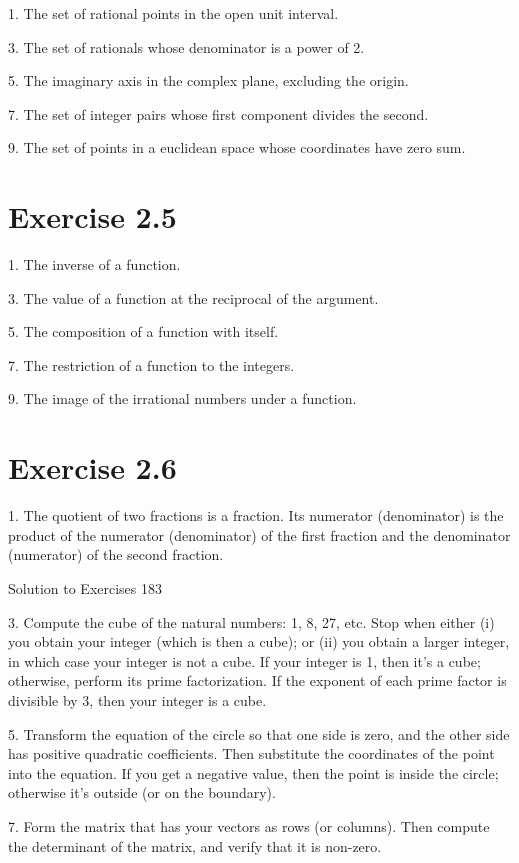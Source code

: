 \documentclass[11pt]{article}
\theoremstyle{plain}
\theoremstyle{definition}
\begin{document}
1. The set of rational points in the open unit interval.

3. The set of rationals whose denominator is a power of 2.

5. The imaginary axis in the complex plane, excluding the origin.

7. The set of integer pairs whose first component divides the second.

9. The set of points in a euclidean space whose coordinates have zero sum.

\section{Exercise 2.5}

1. The inverse of a function.

3. The value of a function at the reciprocal of the argument.

5. The composition of a function with itself.

7. The restriction of a function to the integers.

9. The image of the irrational numbers under a function.

\section{Exercise 2.6}

1. The quotient of two fractions is a fraction. Its numerator (denominator) is the product of the numerator (denominator) of the first fraction and the denominator (numerator) of the second fraction.

Solution to Exercises 183

3. Compute the cube of the natural numbers: 1, 8, 27, etc. Stop when either (i) you obtain your integer (which is then a cube); or (ii) you obtain a larger integer, in which case your integer is not a cube. If your integer is 1, then it's a cube; otherwise, perform its prime factorization. If the exponent of each prime factor is divisible by 3, then your integer is a cube.

5. Transform the equation of the circle so that one side is zero, and the other side has positive quadratic coefficients. Then substitute the coordinates of the point into the equation. If you get a negative value, then the point is inside the circle; otherwise it's outside (or on the boundary).

7. Form the matrix that has your vectors as rows (or columns). Then compute the determinant of the matrix, and verify that it is non-zero.
\end{document}
